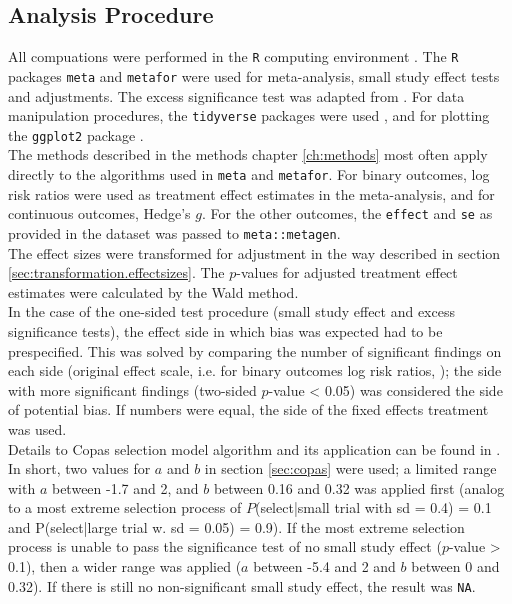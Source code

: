\documentclass[11pt,a4paper,twoside]{book}\usepackage[]{graphicx}\usepackage[]{color}
\begin{document}
\subsection{Analysis Procedure} \label{sec:procedure}
All compuations were performed in the \texttt{R} computing environment \citep{R.base}. The \texttt{R} packages \texttt{meta} \citep{meta.package} and \texttt{metafor} \citep{metafor.package} were used for meta-analysis, small study effect tests and adjustments. The excess significance test was adapted from \citet{vanAert.2019}. For data manipulation procedures, the \texttt{tidyverse} packages were used \citep{tidyverse.package}, and for plotting the \texttt{ggplot2} package \citep{ggplot2}.\\
The methods described in the methods chapter \ref{ch:methods} most often apply directly to the algorithms used in \texttt{meta} and \texttt{metafor}. For binary outcomes, log risk ratios were used as treatment effect estimates in the meta-analysis, and for continuous outcomes, Hedge's $g$. For the other outcomes, the \texttt{effect} and \texttt{se} as provided in the dataset was passed to \texttt{meta::metagen}. \\ 
The effect sizes were transformed for adjustment in the way described in section \ref{sec:transformation.effectsizes}. The $p$-values for adjusted treatment effect estimates were calculated by the Wald method. \\
In the case of the one-sided test procedure (small study effect and excess significance tests), the effect side in which bias was expected had to be prespecified. This was solved by comparing the number of significant findings on each side (original effect scale, i.e. for binary outcomes log risk ratios, \etc); the side with more significant findings (two-sided $p$-value < 0.05) was considered the side of potential bias. If numbers were equal, the side of the fixed effects treatment was used. \\
Details to Copas selection model algorithm and its application can be found in \citet{limitmeta}. In short, two values for $a$ and $b$ in section \ref{sec:copas} were used; a limited range with $a$ between -1.7 and 2, and $b$ between 0.16 and 0.32 was applied first (analog to a most extreme selection process of $P$(select|small trial with sd = 0.4) = 0.1 and P(select|large trial w. sd  = 0.05) = 0.9). If the most extreme selection process is unable to pass the significance test of no small study effect ($p$-value > 0.1), then a wider range was applied ($a$  between -5.4 and 2 and $b$ between 0 and 0.32). If there is still no non-significant small study effect, the result was \texttt{NA}.
\end{document}
